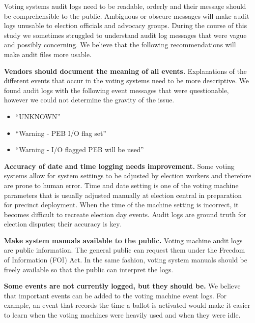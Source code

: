 Voting systems audit logs need to be readable, orderly and their message should
be  comprehensible to the public. Ambiguous or obscure messages will make audit
logs unusable to election officials and advocacy groups. During the course of
this study we sometimes struggled to understand audit log messages that were
vague and possibly concerning. We believe that the following recommendations
will make audit files more usable.


\textbf{Vendors should document the meaning of all events.} Explanations of the different events that occur in the voting systems need to be more descriptive.  We found audit logs with the following event messages that were questionable, however we could not determine the gravity of the issue.
\begin{itemize}
	\item \textquotedblleft UNKNOWN\textquotedblright
	\item \textquotedblleft Warning - PEB I/O flag set\textquotedblright
	\item \textquotedblleft Warning - I/O flagged PEB will be used\textquotedblright
\end{itemize}

\textbf{Accuracy of date and time logging needs improvement.} Some voting
systems allow for system settings to be adjusted by election workers and
therefore are prone to human error. Time and date setting is one of the voting
machine parameters that is usually adjusted manually at election central in
preparation for precinct deployment. When the time of the machine setting is
incorrect, it becomes difficult to recreate election day events. Audit logs are
ground truth for election disputes; their accuracy is key. 

\textbf{Make system manuals available to the public.} Voting machine audit logs are public information. The general public can request them under the Freedom of Information (FOI) Act. In the same fashion, voting system manuals should be freely available so that the public can interpret the logs. 

\textbf{Some events are not currently logged, but they should be.} We believe
that important events can be added to the voting machine event logs. For
example, an event that records the time a ballot is activated would make it
easier to learn when the voting machines were heavily used and when they were idle.


